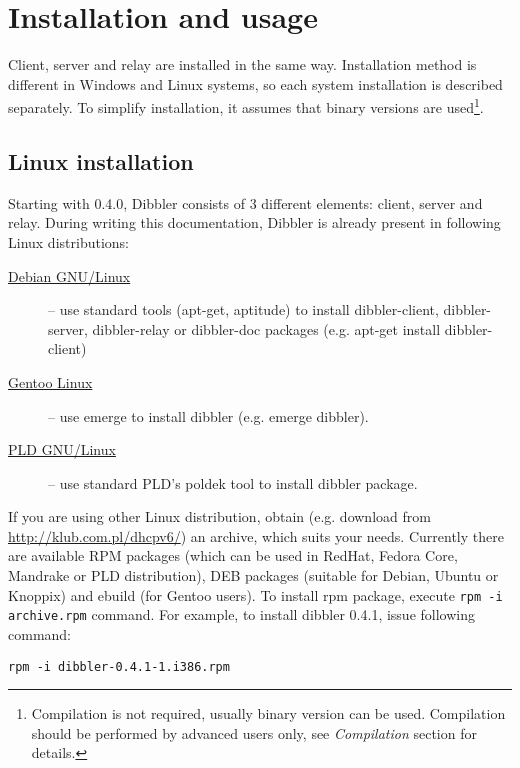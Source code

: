 
\section{Installation and usage}
Client, server and relay are installed in the same way. Installation
method is different in Windows and Linux systems, so each system
installation is described separately. To simplify installation, it
assumes that binary versions are used\footnote{Compilation is not
required, usually binary version can be used. Compilation should be
performed by advanced users only, see \emph{Compilation} section for
details.}.

\subsection{Linux installation}
Starting with 0.4.0, Dibbler consists of 3 different elements: client,
server and relay. During writing this documentation, Dibbler is already
present in following Linux distributions:
\begin{description}
 \item[\href{http://debian.org}{Debian GNU/Linux}] -- use standard tools
 (apt-get, aptitude) to install dibbler-client, dibbler-server,
 dibbler-relay or dibbler-doc packages (e.g. apt-get install dibbler-client)
 \item[\href{http://www.gentoo.org}{Gentoo Linux}] -- use emerge to
 install dibbler (e.g. emerge dibbler).
 \item[\href{http://www.pld-linux.org}{PLD GNU/Linux}] -- use standard
  PLD's poldek tool to install dibbler package.
\end{description}

If you are using other Linux distribution, obtain (e.g. download from
\url{http://klub.com.pl/dhcpv6/}) an archive, which suits your
needs. Currently there are available RPM packages
(which can be used in RedHat, Fedora Core, Mandrake or PLD
distribution), DEB packages (suitable for Debian, Ubuntu or Knoppix) and
ebuild (for Gentoo users). To install rpm package, execute 
\verb+rpm -i archive.rpm+ command. For example, to install dibbler 0.4.1,
issue following command:

\begin{verbatim}
rpm -i dibbler-0.4.1-1.i386.rpm 
\end{verbatim}

